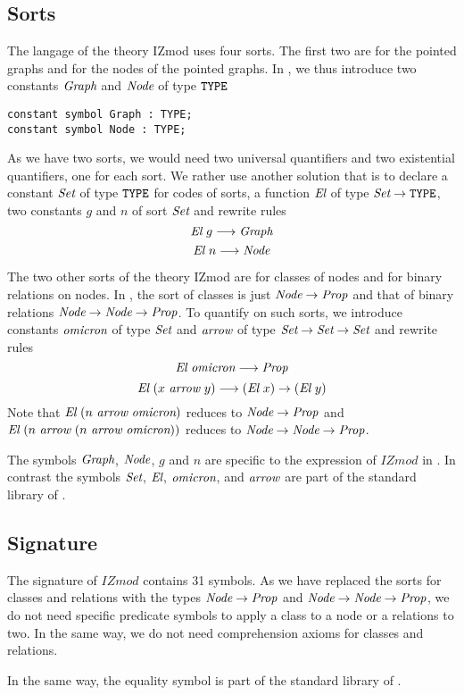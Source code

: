 \documentclass[a4paper]{article}
\begin{document}
\subsection{Sorts}

The langage of the theory IZmod uses four sorts. The first two are for
the pointed graphs and for the nodes of the pointed graphs.  In
\dedukti, we thus introduce two constants ${\mbox{\it Graph}}$ and ${\mbox{\it Node}}$ of type
$\mbox{\tt TYPE}$
\begin{lstlisting}
constant symbol Graph : TYPE;
constant symbol Node : TYPE;
\end{lstlisting}
As we have two sorts, we would need two universal quantifiers and two
existential quantifiers, one for each sort.  We rather use another
solution \cite{theoryU} that is to declare a constant $\mbox{\it Set}$ of type
$\mbox{\tt TYPE}$ for codes of sorts, a function ${\mbox{\it El}}$ of type $\mbox{\it Set} \rightarrow \mbox{\tt TYPE}$,
two constants $g$ and $n$ of sort $\mbox{\it Set}$ and rewrite rules
$${\mbox{\it El}}~g \longrightarrow {\mbox{\it Graph}}$$
$${\mbox{\it El}}~n \longrightarrow {\mbox{\it Node}}$$

The two other sorts of the theory IZmod are for classes of nodes and
for binary relations on nodes.  In \dedukti, the sort of classes is
just ${\mbox{\it Node}} \rightarrow {\mbox{\it Prop}}$ and that of binary relations
${\mbox{\it Node}} \rightarrow {\mbox{\it Node}} \rightarrow {\mbox{\it Prop}}$. To quantify on such sorts, we introduce
constants ${\mbox{\it omicron}}$ of type $\mbox{\it Set}$ and ${\mbox{\it arrow}} $ of type
$\mbox{\it Set} \rightarrow \mbox{\it Set} \rightarrow \mbox{\it Set}$ and rewrite rules
$${\mbox{\it El}}~{\mbox{\it omicron}} \longrightarrow {\mbox{\it Prop}}$$
$${\mbox{\it El}}~(x~{\mbox{\it arrow}}~y) \longrightarrow ({\mbox{\it El}}~x) \rightarrow ({\mbox{\it El}}~y)$$
Note that ${\mbox{\it El}}~(n~{\mbox{\it arrow}}~{\mbox{\it omicron}})$ reduces to ${\mbox{\it Node}} \rightarrow {\mbox{\it Prop}}$ and 
${\mbox{\it El}}~(n~{\mbox{\it arrow}}~(n~{\mbox{\it arrow}}~{\mbox{\it omicron}}))$ reduces to ${\mbox{\it Node}} \rightarrow {\mbox{\it Node}} \rightarrow {\mbox{\it Prop}}$. 

The symbols ${\mbox{\it Graph}}$, ${\mbox{\it Node}}$, $g$ and $n$ are specific to the
expression of $IZmod$ in \dedukti. In contrast the symbols $\mbox{\it Set}$,
${\mbox{\it El}}$, ${\mbox{\it omicron}}$, and ${\mbox{\it arrow}}$ are part of the standard library of 
\dedukti.

\subsection{Signature}

The signature of $IZmod$ contains 31 symbols. As we have replaced the
sorts for classes and relations with the \dedukti types
${\mbox{\it Node}} \rightarrow {\mbox{\it Prop}}$ and ${\mbox{\it Node}} \rightarrow {\mbox{\it Node}} \rightarrow {\mbox{\it Prop}}$, we do not need
specific predicate symbols to apply a class to a node or a relations
to two. In the same way, we do not need comprehension axioms for 
classes and relations. 

In the same way, the equality symbol is part of the standard library of 
\dedukti.
\end{document}
